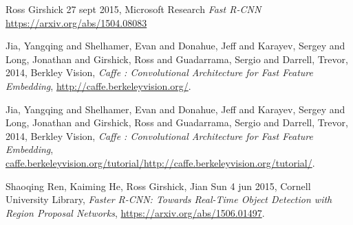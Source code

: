 \begin{thebibliography}{9}
  Ross Girshick
  27 sept 2015, 
  Microsoft Research
  \emph{Fast R-CNN}
  \url{https://arxiv.org/abs/1504.08083}
  
  Jia, Yangqing and Shelhamer, Evan and Donahue, Jeff and Karayev, Sergey and Long, Jonathan and Girshick, Ross and Guadarrama, Sergio and Darrell, Trevor,
  2014,
  Berkley Vision,
  \emph{Caffe : Convolutional Architecture for Fast Feature Embedding},
  \url{http://caffe.berkeleyvision.org/}.

  Jia, Yangqing and Shelhamer, Evan and Donahue, Jeff and Karayev, Sergey and Long, Jonathan and Girshick, Ross and Guadarrama, Sergio and Darrell, Trevor,
  2014,
  Berkley Vision,
  \emph{Caffe : Convolutional Architecture for Fast Feature Embedding},
  \url{caffe.berkeleyvision.org/tutorial/http://caffe.berkeleyvision.org/tutorial/}.

  Shaoqing Ren, Kaiming He, Ross Girshick, Jian Sun
  4 jun 2015,
  Cornell University Library,
  \emph{Faster R-CNN: Towards Real-Time Object Detection with Region Proposal Networks},
  \url{https://arxiv.org/abs/1506.01497}.
  
\end{thebibliography}